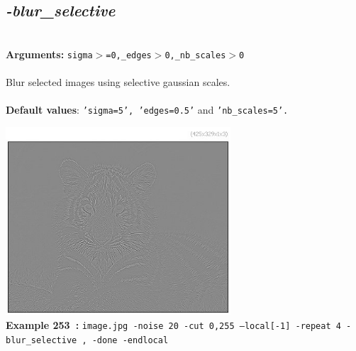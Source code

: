 \documentclass[a4paper,11pt,twoside]{book}
\begin{document}
\subsection{\emph{-blur\_selective} }\vspace*{-0.5em}
~\\\textbf{Arguments: } 
{\small \texttt{sigma$>$=0,\_edges$>$0,\_nb\_scales$>$0}}\\~\\
Blur selected images using selective gaussian scales.
~\\~\\\textbf{Default values}: {\small \texttt{'sigma=5', 'edges=0.5'} and \texttt{'nb\_scales=5'.}}
\begin{center}\includegraphics[keepaspectratio=true,height=7cm,width=\textwidth]{img/gmic_def253.jpg}\\
{\footnotesize \textbf{Example 253~:} \texttt{image.jpg -noise 20 -cut 0,255 --local[-1] -repeat 4 -blur\_selective , -done -endlocal}}
\end{center}
\end{document}
